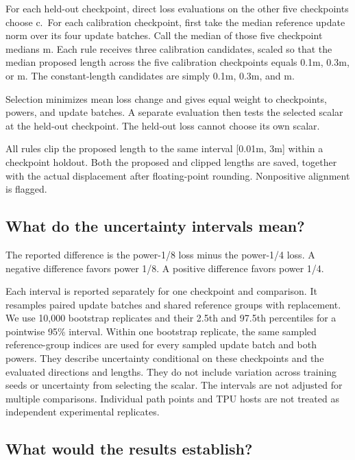 \documentclass[
  14pt,
  letterpaper,
]{extarticle}
\begin{document}
For each held-out checkpoint, direct loss evaluations on the other five
checkpoints choose c.~For each calibration checkpoint, first take the
median reference update norm over its four update batches. Call the
median of those five checkpoint medians m. Each rule receives three
calibration candidates, scaled so that the median proposed length across
the five calibration checkpoints equals 0.1m, 0.3m, or m. The
constant-length candidates are simply 0.1m, 0.3m, and m.

Selection minimizes mean loss change and gives equal weight to
checkpoints, powers, and update batches. A separate evaluation then
tests the selected scalar at the held-out checkpoint. The held-out loss
cannot choose its own scalar.

All rules clip the proposed length to the same interval {[}0.01m, 3m{]}
within a checkpoint holdout. Both the proposed and clipped lengths are
saved, together with the actual displacement after floating-point
rounding. Nonpositive alignment is flagged.

\subsection{What do the uncertainty intervals
mean?}\label{what-do-the-uncertainty-intervals-mean}

The reported difference is the power-1/8 loss minus the power-1/4 loss.
A negative difference favors power 1/8. A positive difference favors
power 1/4.

Each interval is reported separately for one checkpoint and comparison.
It resamples paired update batches and shared reference groups with
replacement. We use 10,000 bootstrap replicates and their 2.5th and
97.5th percentiles for a pointwise 95\% interval. Within one bootstrap
replicate, the same sampled reference-group indices are used for every
sampled update batch and both powers. They describe uncertainty
conditional on these checkpoints and the evaluated directions and
lengths. They do not include variation across training seeds or
uncertainty from selecting the scalar. The intervals are not adjusted
for multiple comparisons. Individual path points and TPU hosts are not
treated as independent experimental replicates.

\subsection{What would the results
establish?}\label{what-would-the-results-establish}
\end{document}
